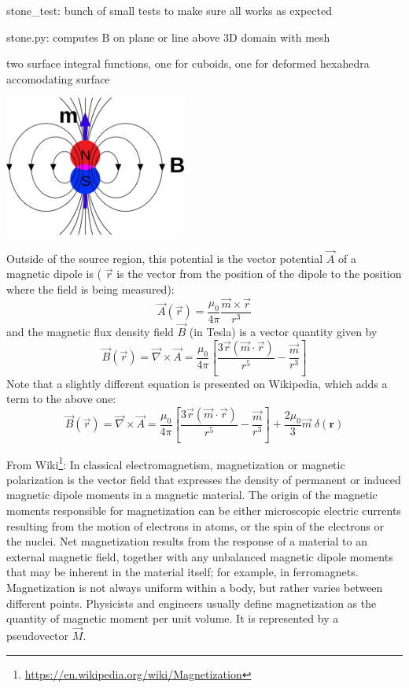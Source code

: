 





stone\_test: bunch of small tests to make sure all works as expected 

stone.py: computes B on plane or line above 3D domain with mesh

two surface integral functions, one for cuboids, one for deformed hexahedra accomodating surface











\begin{center}
\includegraphics[width=6cm]{python_codes/fieldstone_138/images/Magnetic_field_due_to_dipole_moment.png}
\end{center}

Outside of the source region, this potential is the vector potential $\vec A$ of a magnetic dipole is (
$\vec r$ is the vector from the position of the dipole to the position where the field is being measured):
\[
\vec A(\vec r) = \frac{\mu_0}{4 \pi} \frac{\vec m \times \vec r}{r^3}
\]
and the magnetic flux density field $\vec B$ (in Tesla) is a vector quantity given by
\[
\vec B (\vec r) = \vec \nabla \times \vec A 
=
\frac{\mu_0}{4\pi} \left[  \frac{3 \vec r (\vec m \cdot \vec r)}{r^5} - \frac{\vec m}{r^3}  \right]
\]
Note that a slightly different equation is presented on Wikipedia, which adds a term to the above one:
\[
\vec B (\vec r) = \vec \nabla \times \vec A 
=
\frac{\mu_0}{4\pi} \left[  \frac{3 \vec r (\vec m \cdot \vec r)}{r^5} - \frac{\vec m}{r^3}  \right]
+ \frac{2\mu_0}{3} \vec m \; \delta(\bm r)
\]

From Wiki\footnote{\url{https://en.wikipedia.org/wiki/Magnetization}}: In classical electromagnetism, magnetization or magnetic polarization is the vector field that expresses the density of permanent or induced magnetic dipole moments in a magnetic material. The origin of the magnetic moments responsible for magnetization can be either microscopic electric currents resulting from the motion of electrons in atoms, or the spin of the electrons or the nuclei. Net magnetization results from the response of a material to an external magnetic field, together with any unbalanced magnetic dipole moments that may be inherent in the material itself; for example, in ferromagnets. Magnetization is not always uniform within a body, but rather varies between different points. 
Physicists and engineers usually define magnetization as the quantity of magnetic moment per unit volume. It is represented by a pseudovector $\vec M$.

